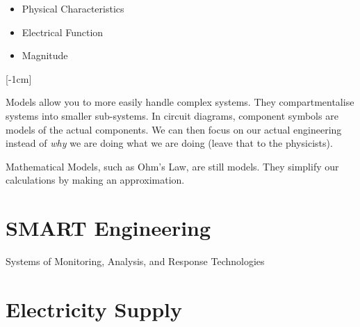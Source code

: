 \documentclass[12pt]{article}
\begin{document}
\begin{itemize}
  \item Physical Characteristics 
  \item Electrical Function
  \item Magnitude
\end{itemize}

[-1cm]

\vspace{3pt}
Models allow you to more easily handle complex systems.
They compartmentalise systems into smaller sub-systems.
In circuit diagrams, component symbols are models of the actual components.
We can then focus on our actual engineering instead of {\it why} we are doing what we are doing (leave that to the physicists).

Mathematical Models, such as Ohm's Law, are still models. 
They simplify our calculations by making an approximation.

\section{SMART Engineering}
\begin{definition*}
  Systems of Monitoring, Analysis, and Response Technologies
\end{definition*}

\section{Electricity Supply}
\end{document}
